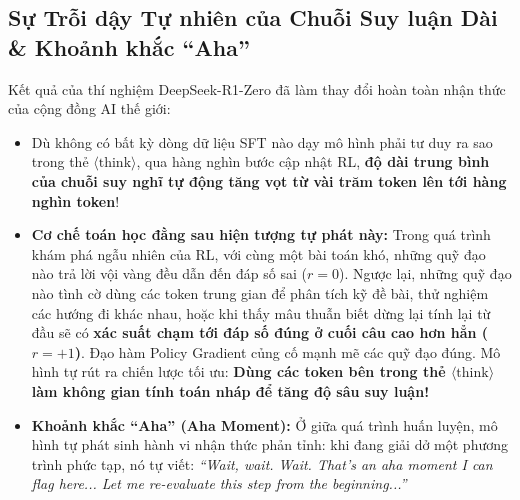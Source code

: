 \subsection{Sự Trỗi dậy Tự nhiên của Chuỗi Suy luận Dài \& Khoảnh khắc ``Aha''}
Kết quả của thí nghiệm DeepSeek-R1-Zero đã làm thay đổi hoàn toàn nhận thức của cộng đồng AI thế giới:
\begin{itemize}[leftmargin=1.2cm]
    \item Dù không có bất kỳ dòng dữ liệu SFT nào dạy mô hình phải tư duy ra sao trong thẻ $\langle\text{think}\rangle$, qua hàng nghìn bước cập nhật RL, \textbf{độ dài trung bình của chuỗi suy nghĩ tự động tăng vọt từ vài trăm token lên tới hàng nghìn token}!
    \item \textbf{Cơ chế toán học đằng sau hiện tượng tự phát này:}
    Trong quá trình khám phá ngẫu nhiên của RL, với cùng một bài toán khó, những quỹ đạo nào trả lời vội vàng đều dẫn đến đáp số sai ($r = 0$). Ngược lại, những quỹ đạo nào tình cờ dùng các token trung gian để phân tích kỹ đề bài, thử nghiệm các hướng đi khác nhau, hoặc khi thấy mâu thuẫn biết dừng lại tính lại từ đầu sẽ có \textbf{xác suất chạm tới đáp số đúng ở cuối câu cao hơn hẳn ($r = +1$)}.
    Đạo hàm Policy Gradient củng cố mạnh mẽ các quỹ đạo đúng. Mô hình tự rút ra chiến lược tối ưu: \textbf{Dùng các token bên trong thẻ $\langle\text{think}\rangle$ làm không gian tính toán nháp để tăng độ sâu suy luận!}
    \item \textbf{Khoảnh khắc ``Aha'' (Aha Moment):} Ở giữa quá trình huấn luyện, mô hình tự phát sinh hành vi nhận thức phản tỉnh: khi đang giải dở một phương trình phức tạp, nó tự viết: \textit{``Wait, wait. Wait. That's an aha moment I can flag here... Let me re-evaluate this step from the beginning...''}
\end{itemize}

